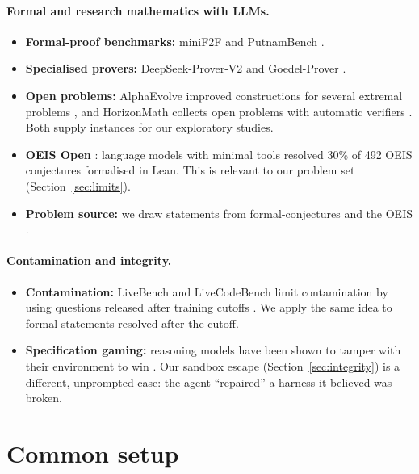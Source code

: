 \documentclass[11pt]{article}
\begin{document}
\paragraph{Formal and research mathematics with LLMs.}
\begin{itemize}
  \item \textbf{Formal-proof benchmarks:} miniF2F and PutnamBench \citep{zheng2021minif2f,tsoukalas2024putnambench}.
  \item \textbf{Specialised provers:} DeepSeek-Prover-V2 and Goedel-Prover \citep{ren2025deepseekprover,lin2025goedel}.
  \item \textbf{Open problems:} AlphaEvolve improved constructions for several extremal problems
    \citep{novikov2025alphaevolve}, and HorizonMath collects open problems with automatic verifiers
    \citep{wang2026horizonmath}. Both supply instances for our exploratory studies.
  \item \textbf{OEIS Open} \citep{adamczewski2026oeisopen}: language models with minimal tools resolved 30\% of 492 OEIS
    conjectures formalised in Lean. This is relevant to our problem set (Section~\ref{sec:limits}).
  \item \textbf{Problem source:} we draw statements from formal-conjectures \citep{formalconjectures} and the OEIS
    \citep{oeis}.
\end{itemize}

\paragraph{Contamination and integrity.}
\begin{itemize}
  \item \textbf{Contamination:} LiveBench and LiveCodeBench limit contamination by using questions released after
    training cutoffs \citep{white2024livebench,jain2024livecodebench}. We apply the same idea to formal statements
    resolved after the cutoff.
  \item \textbf{Specification gaming:} reasoning models have been shown to tamper with their environment to win
    \citep{bondarenko2025specgaming}. Our sandbox escape (Section~\ref{sec:integrity}) is a different, unprompted case:
    the agent ``repaired'' a harness it believed was broken.
\end{itemize}

\section{Common setup}
\label{sec:setup}
\end{document}
